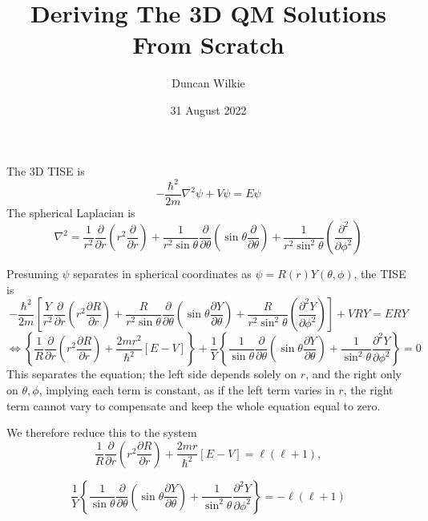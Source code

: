 \documentclass{article}
\title{Deriving The 3D QM Solutions From Scratch}
\author{Duncan Wilkie}
\date{31 August 2022}
\begin{document}
\maketitle

The 3D TISE is
\[
  -\frac{\hbar^{2}}{2m}\nabla^{2}\psi+V\psi = E\psi
\]
The spherical Laplacian is
\[
  \nabla^{2} = \frac{1}{r^{2}}\frac{\partial}{\partial r}\left( r^{2}\frac{\partial}{\partial r} \right)
  + \frac{1}{r^{2}\sin\theta}\frac{\partial}{\partial\theta}\left( \sin\theta\frac{\partial}{\partial\theta} \right)
  + \frac{1}{r^{2}\sin^{2}\theta}\left( \frac{\partial^{2}}{\partial\phi^{2}} \right)
\]

Presuming $\psi$ separates in spherical coordinates as $\psi=R(r)Y(\theta,\phi)$, the TISE is
\[
  -\frac{\hbar^{2}}{2m}\left[ \frac{Y}{r^{2}}\frac{\partial}{\partial r}\left( r^{2}\frac{\partial R}{\partial r}  \right)
    + \frac{R}{r^{2}\sin\theta}\frac{\partial}{\partial\theta}\left( \sin\theta\frac{\partial Y}{\partial\theta} \right)
    + \frac{R}{r^{2}\sin^{2}\theta}\left( \frac{\partial^{2}Y}{\partial\phi^{2}} \right)\right] + VRY = ERY
\]
\[
  \Leftrightarrow \left\{  \frac{1}{R}\frac{\partial}{\partial r}\left( r^{2}\frac{\partial R}{\partial r}  \right) +\frac{2mr^{2}}{\hbar^{2}}[E-V]\right\}
  + \frac{1}{Y}\left\{\frac{1}{\sin\theta}\frac{\partial}{\partial\theta}\left( \sin\theta\frac{\partial Y}{\partial\theta} \right)
  + \frac{1}{\sin^{2}\theta}\frac{\partial^{2}Y}{\partial\phi^{2}}\right\} = 0
\]
This separates the equation; the left side depends solely on $r$, and the right only on $\theta,\phi$, implying each term is constant,
as if the left term varies in $r$, the right term cannot vary to compensate and keep the whole equation equal to zero.

We therefore reduce this to the system
\[
  \frac{1}{R}\frac{\partial}{\partial r}\left( r^{2}\frac{\partial R}{\partial r} \right) + \frac{2mr}{\hbar^{2}}[E-V] = \ell(\ell+1),
\]

\[
  \frac{1}{Y}\left\{\frac{1}{\sin\theta}\frac{\partial}{\partial\theta}\left( \sin\theta\frac{\partial Y}{\partial\theta} \right)
  + \frac{1}{\sin^{2}\theta}\frac{\partial^{2}Y}{\partial\phi^{2}}\right\} = -\ell(\ell+1)
\]
\end{document}
